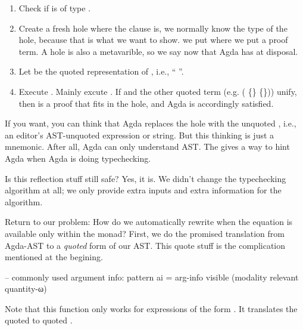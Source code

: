 \documentclass{article}
\begin{document}
\begin{enumerate}
  \item Check if  is of type    .
  \item Create a fresh hole where the  clause is, we normally know the type of the hole, because that is what we want to show. we put  where we put a proof term. A hole is also a metavarible, so we say now that Agda has  \AgdaSymbol{:}  at disposal.
  \item Let  \AgdaSymbol{:}  be the quoted representation of , i.e., `` \AgdaSymbol{=}  ''.
  \item Execute  . Mainly excute    . If  and the other quoted term  (e.g.  \AgdaSymbol( \AgdaSymbol\{\AgdaSymbol\} \AgdaSymbol\{\AgdaSymbol\}\AgdaSymbol)) unify, then  is a proof that fits in the hole, and Agda is accordingly satisfied.
\end{enumerate}

If you want, you can think that Agda replaces the hole with the unquoted , i.e., an editor's AST-unquoted expression or string. But this thinking is just a mnemonic. After all, Agda can only understand AST. The gives a way to hint Agda when Agda is doing typechecking.

Is this reflection stuff still safe? Yes, it is. We didn't change the typechecking algorithm at all; we only provide extra inputs and extra information for the algorithm.

Return to our problem: How do we automatically rewrite when the equation is available only within the  monad? First, we do the promised translation from Agda-AST to a \emph{quoted} form of our AST. This quote stuff is the complication mentioned at the begining.

\begin{code}
-- commonly used argument info:
pattern ai = arg-info visible (modality relevant quantity-ω)
\end{code}

Note that this function only works for expressions of the form  \AgdaOperator{\AgdaFunction{+}}  \AgdaOperator{\AgdaFunction{+}} . It translates the quoted  \AgdaOperator{\AgdaFunction{+}}  \AgdaOperator{\AgdaFunction{+}}  to quoted  \AgdaOperator{\AgdaInductiveConstructor{:+}}  \AgdaOperator{\AgdaInductiveConstructor{:+}} .
\end{document}
